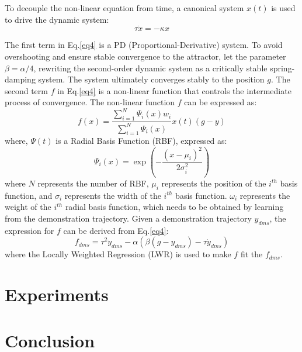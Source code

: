 \documentclass[journal]{IEEEtran}
\begin{document}
To decouple the non-linear equation from time, a canonical system $x(t)$ is used to drive the dynamic system:
\begin{equation}
    \tau \dot x = - \kappa x
\end{equation}

The first term in Eq.\ref{eq4} is a PD (Proportional-Derivative) system. To avoid overshooting and ensure stable convergence to the attractor, let the parameter $\beta = \alpha / 4$, rewriting the second-order dynamic system as a critically stable spring-damping system. The system ultimately converges stably to the position $g$. The second term $f$ in Eq.\ref{eq4} is a non-linear function that controls the intermediate process of convergence. The non-linear function $f$ can be expressed as:
\begin{equation}
    f(x)=\frac{\sum\limits_{i=1}^{N} \Psi_{i}(x) w_{i}}{\sum\limits_{i=1}^{N} \Psi_{i}(x)}x(t)(g-y)
    \label{eq5}
\end{equation}
where, $\Psi(t)$ is a Radial Basis Function (RBF), expressed as:
\begin{equation}
    \Psi_i(x)= \exp \left(-\frac{\left(x-\mu_i \right)^{2}}{2 \sigma_i^{2}}\right)
\end{equation}
where $N$ represents the number of RBF, $\mu_i$ represents the position of the $i^{th}$ basis function, and $\sigma_i$ represents the width of the $i^{th}$ basis function. $\omega_i$ represents the weight of the $i^{th}$ radial basis function, which needs to be obtained by learning from the demonstration trajectory. Given a demonstration trajectory $y_{dms}$, the expression for $f$ can be derived from Eq.\ref{eq4}:
\begin{equation}
    f_{dms} = \tau^2 \ddot y_{dms} - \alpha(\beta (g-y_{dms})-\tau \dot y_{dms})
    \label{eq6}
\end{equation}
where the Locally Weighted Regression (LWR) is used to make $f$ fit the $f_{dms}$.

\section{Experiments}


\section{Conclusion}


\end{document}
